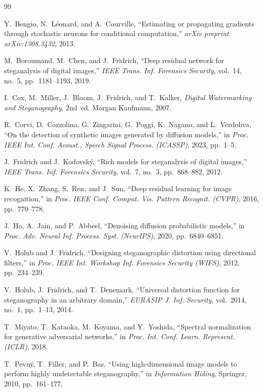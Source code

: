 \documentclass[journal]{IEEEtran}
\begin{document}
\begin{thebibliography}{99}

Y.~Bengio, N.~L{\'e}onard, and A.~Courville, ``Estimating or propagating gradients through stochastic neurons for conditional computation,'' \emph{arXiv preprint arXiv:1308.3432}, 2013.

M.~Boroumand, M.~Chen, and J.~Fridrich, ``Deep residual network for steganalysis of digital images,'' \emph{IEEE Trans. Inf. Forensics Security}, vol.~14, no.~5, pp.~1181--1193, 2019.

I.~Cox, M.~Miller, J.~Bloom, J.~Fridrich, and T.~Kalker, \emph{Digital Watermarking and Steganography}, 2nd~ed. Morgan Kaufmann, 2007.

R.~Corvi, D.~Cozzolino, G.~Zingarini, G.~Poggi, K.~Nagano, and L.~Verdoliva, ``On the detection of synthetic images generated by diffusion models,'' in \emph{Proc. IEEE Int. Conf. Acoust., Speech Signal Process. (ICASSP)}, 2023, pp.~1--5.

J.~Fridrich and J.~Kodovsk{\'y}, ``Rich models for steganalysis of digital images,'' \emph{IEEE Trans. Inf. Forensics Security}, vol.~7, no.~3, pp.~868--882, 2012.

K.~He, X.~Zhang, S.~Ren, and J.~Sun, ``Deep residual learning for image recognition,'' in \emph{Proc. IEEE Conf. Comput. Vis. Pattern Recognit. (CVPR)}, 2016, pp.~770--778.

J.~Ho, A.~Jain, and P.~Abbeel, ``Denoising diffusion probabilistic models,'' in \emph{Proc. Adv. Neural Inf. Process. Syst. (NeurIPS)}, 2020, pp.~6840--6851.

V.~Holub and J.~Fridrich, ``Designing steganographic distortion using directional filters,'' in \emph{Proc. IEEE Int. Workshop Inf. Forensics Security (WIFS)}, 2012, pp.~234--239.

V.~Holub, J.~Fridrich, and T.~Denemark, ``Universal distortion function for steganography in an arbitrary domain,'' \emph{EURASIP J. Inf. Security}, vol.~2014, no.~1, pp.~1--13, 2014.

T.~Miyato, T.~Kataoka, M.~Koyama, and Y.~Yoshida, ``Spectral normalization for generative adversarial networks,'' in \emph{Proc. Int. Conf. Learn. Represent. (ICLR)}, 2018.

T.~Pevn{\'y}, T.~Filler, and P.~Bas, ``Using high-dimensional image models to perform highly undetectable steganography,'' in \emph{Information Hiding}, Springer, 2010, pp.~161--177.


\end{thebibliography}
\end{document}
